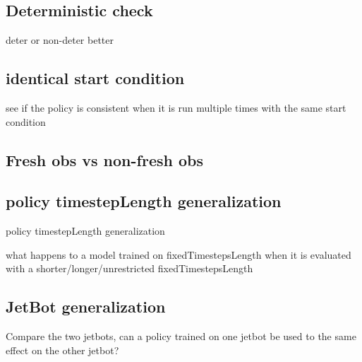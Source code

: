 \subsection{Deterministic check}

deter or non-deter better

\subsection{identical start condition}

see if the policy is consistent when it is run multiple times with the same start condition



\subsection{Fresh obs vs non-fresh obs}

 





\subsection{policy timestepLength generalization}

policy timestepLength generalization 

what happens to a model trained on fixedTimestepsLength when it is evaluated with a shorter/longer/unrestricted fixedTimestepsLength



\subsection{JetBot generalization}

Compare the two jetbots, can a policy trained on one jetbot be used to the same effect on the other jetbot?

